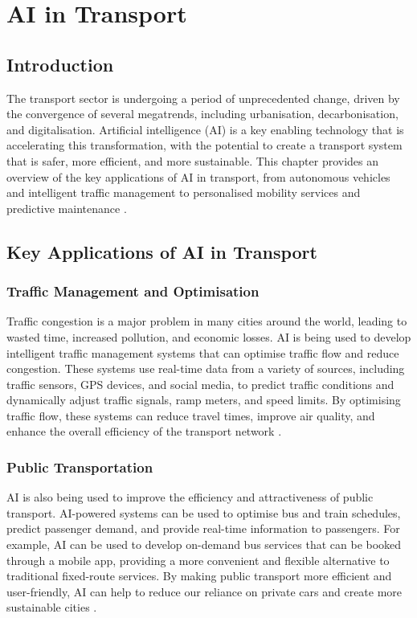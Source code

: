 \chapter{AI in Transport}
\label{cha:ai_in_transport}

\section{Introduction}

The transport sector is undergoing a period of unprecedented change, driven by the convergence of several megatrends, including urbanisation, decarbonisation, and digitalisation. Artificial intelligence (AI) is a key enabling technology that is accelerating this transformation, with the potential to create a transport system that is safer, more efficient, and more sustainable. This chapter provides an overview of the key applications of AI in transport, from autonomous vehicles and intelligent traffic management to personalised mobility services and predictive maintenance \parencite{ma2020review}.

\section{Key Applications of AI in Transport}

\subsection{Traffic Management and Optimisation}

Traffic congestion is a major problem in many cities around the world, leading to wasted time, increased pollution, and economic losses. AI is being used to develop intelligent traffic management systems that can optimise traffic flow and reduce congestion. These systems use real-time data from a variety of sources, including traffic sensors, GPS devices, and social media, to predict traffic conditions and dynamically adjust traffic signals, ramp meters, and speed limits. By optimising traffic flow, these systems can reduce travel times, improve air quality, and enhance the overall efficiency of the transport network \parencite{abduljabbar2019applications}.

\subsection{Public Transportation}

AI is also being used to improve the efficiency and attractiveness of public transport. AI-powered systems can be used to optimise bus and train schedules, predict passenger demand, and provide real-time information to passengers. For example, AI can be used to develop on-demand bus services that can be booked through a mobile app, providing a more convenient and flexible alternative to traditional fixed-route services. By making public transport more efficient and user-friendly, AI can help to reduce our reliance on private cars and create more sustainable cities \parencite{isalkar2024artificial}.

